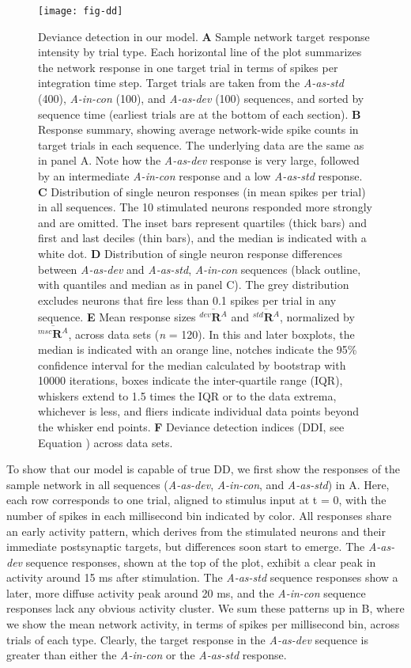 \documentclass[9pt,lineno,onehalfspacing]{elife}
\newcommand{\dev}{\textit{A-as-dev}}
\newcommand{\msc}{\textit{A-in-con}}
\newcommand{\std}{\textit{A-as-std}}
\newcommand{\R}[3][]{{}^{#1}_{}\boldsymbol R^{#2}_{#3}}
\newcommand{\mean}[1]{\overline{#1}}
\begin{document}
\begin{figure}
    \texttt{[image: fig-dd]}
    \caption{%
        Deviance detection in our model.
        \textbf{A} Sample network target response intensity by trial type. Each horizontal line of the plot summarizes the network response in one target trial in terms of spikes per integration time step. Target trials are taken from the \std{} (400), \msc{} (100), and \dev{} (100) sequences, and sorted by sequence time (earliest trials are at the bottom of each section).
        \textbf{B} Response summary, showing average network-wide spike counts in target trials in each sequence. The underlying data are the same as in panel A. Note how the \dev{} response is very large, followed by an intermediate \msc{} response and a low \std{} response.
        \textbf{C} Distribution of single neuron responses (in mean spikes per trial) in all sequences. The 10 stimulated neurons responded more strongly and are omitted. The inset bars represent quartiles (thick bars) and first and last deciles (thin bars), and the median is indicated with a white dot.
        \textbf{D} Distribution of single neuron response differences between \dev{} and \std{}, \msc{} sequences (black outline, with quantiles and median as in panel C). The grey distribution excludes neurons that fire less than 0.1 spikes per trial in any sequence.
        \textbf{E} Mean response sizes $\mean{\R[dev]{A}{}}$ and $\mean{\R[std]{A}{}}$, normalized by $\mean{\R[msc]{A}{}}$, across data sets (\textit{n} = 120). In this and later boxplots, the median is indicated with an orange line, notches indicate the 95\% confidence interval for the median calculated by bootstrap with 10000 iterations, boxes indicate the inter-quartile range (IQR), whiskers extend to 1.5 times the IQR or to the data extrema, whichever is less, and fliers indicate individual data points beyond the whisker end points.
        \textbf{F} Deviance detection indices (DDI, see Equation ) across data sets.
    }
    \label{fig:DD}
\end{figure}

To show that our model is capable of true DD, we first show the responses of the sample network in all sequences (\dev{}, \msc{}, and \std{}) in A. Here, each row corresponds to one trial, aligned to stimulus input at t = 0, with the number of spikes in each millisecond bin indicated by color. All responses share an early activity pattern, which derives from the stimulated neurons and their immediate postsynaptic targets, but differences soon start to emerge. The \dev{} sequence responses, shown at the top of the plot, exhibit a clear peak in activity around 15 ms after stimulation. The \std{} sequence responses show a later, more diffuse activity peak around 20 ms, and the \msc{} sequence responses lack any obvious activity cluster. We sum these patterns up in B, where we show the mean network activity, in terms of spikes per millisecond bin, across trials of each type. Clearly, the target response in the \dev{} sequence is greater than either the \msc{} or the \std{} response.
\end{document}
